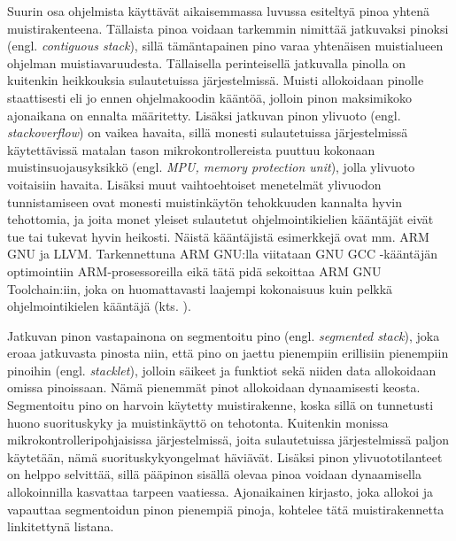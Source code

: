 Suurin osa ohjelmista käyttävät aikaisemmassa luvussa esiteltyä pinoa yhtenä muistirakenteena. Tällaista pinoa voidaan tarkemmin nimittää jatkuvaksi pinoksi (engl. \textit{contiguous stack}), sillä tämäntapainen pino varaa yhtenäisen muistialueen ohjelman muistiavaruudesta. Tällaisella perinteisellä jatkuvalla pinolla on kuitenkin heikkouksia sulautetuissa järjestelmissä. Muisti allokoidaan pinolle staattisesti eli jo ennen ohjelmakoodin kääntöä, jolloin pinon maksimikoko ajonaikana on ennalta määritetty. Lisäksi jatkuvan pinon ylivuoto (engl. \textit{stackoverflow}) on vaikea havaita, sillä monesti sulautetuissa järjestelmissä käytettävissä matalan tason mikrokontrollereista puuttuu kokonaan muistinsuojausyksikkö (engl. \textit{MPU, memory protection unit}), jolla ylivuoto voitaisiin havaita. Lisäksi muut vaihtoehtoiset menetelmät ylivuodon tunnistamiseen ovat monesti muistinkäytön tehokkuuden kannalta hyvin tehottomia, ja joita monet yleiset sulautetut ohjelmointikielien kääntäjät eivät tue tai tukevat hyvin heikosti. Näistä kääntäjistä esimerkkejä ovat mm. ARM GNU ja LLVM.\cite{bsstes@2023} Tarkennettuna ARM GNU:lla viitataan GNU GCC -kääntäjän optimointiin ARM-prosessoreilla eikä tätä pidä sekoittaa ARM GNU Toolchain:iin, joka on huomattavasti laajempi kokonaisuus kuin pelkkä ohjelmointikielen kääntäjä (kts. \cite{arm}).

Jatkuvan pinon vastapainona on segmentoitu pino (engl. \textit{segmented stack}), joka eroaa jatkuvasta pinosta niin, että pino on jaettu pienempiin erillisiin pienempiin pinoihin (engl. \textit{stacklet}), jolloin säikeet ja funktiot sekä niiden data allokoidaan omissa pinoissaan. Nämä pienemmät pinot allokoidaan dynaamisesti keosta. Segmentoitu pino on harvoin käytetty muistirakenne, koska sillä on tunnetusti huono suorituskyky ja muistinkäyttö on tehotonta. Kuitenkin monissa mikrokontrolleripohjaisissa järjestelmissä, joita sulautetuissa järjestelmissä paljon käytetään, nämä suorituskykyongelmat häviävät. Lisäksi pinon ylivuototilanteet on helppo selvittää, sillä pääpinon sisällä olevaa pinoa voidaan dynaamisella allokoinnilla kasvattaa tarpeen vaatiessa. Ajonaikainen kirjasto, joka allokoi ja vapauttaa segmentoidun pinon pienempiä pinoja, kohtelee tätä muistirakennetta linkitettynä listana.\cite{bsstes@2023}

